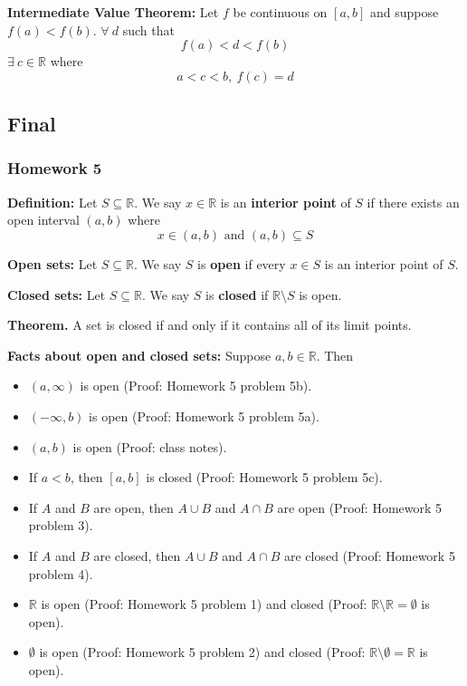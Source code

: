 \textbf{Intermediate Value Theorem:} Let \(f\) be continuous on \([a, b]\) and suppose \(f(a) < f(b)\). \(\forall \ d\) such that \[f(a) < d < f(b)\]  \(\exists \ c \in \mathbb{R}\) where \[a < c < b, \ f(c) = d\]

\pagebreak

\subsection{Final}

\subsubsection{Homework 5}

\textbf{Definition:} Let \(S \subseteq \mathbb{R}\). We say \(x \in \mathbb{R}\) is an \textbf{interior point} of \(S\) if there exists an open interval \((a, b)\) where \[x \in (a, b) \text{ and } (a, b) \subseteq S\]

\textbf{Open sets:} Let \(S \subseteq \mathbb{R}\). We say \(S\) is \textbf{open} if every \(x \in S\) is an interior point of \(S\).

\textbf{Closed sets:} Let \(S \subseteq \mathbb{R}\). We say \(S\) is \textbf{closed} if \(\mathbb{R} \setminus S\) is open.

\textbf{Theorem.} A set is closed if and only if it contains all of its limit points.

\textbf{Facts about open and closed sets:} Suppose \(a, b \in \mathbb{R}\). Then

\begin{itemize}

\item \((a, \infty)\) is open (Proof: Homework 5 problem 5b).

\item \((-\infty, b)\) is open (Proof: Homework 5 problem 5a).

\item \((a, b)\) is open (Proof: class notes).

\item If \(a < b\), then \([a, b]\) is closed (Proof: Homework 5 problem 5c).

\item If \(A\) and \(B\) are open, then \(A \cup B\) and \(A \cap B\) are open (Proof: Homework 5 problem 3).

\item If \(A\) and \(B\) are closed, then \(A \cup B\) and \(A \cap B\) are closed (Proof: Homework 5 problem 4).

\item \(\mathbb{R}\) is open (Proof: Homework 5 problem 1) and closed (Proof: \(\mathbb{R} \setminus \mathbb{R} = \emptyset\) is open).

\item \(\emptyset\) is open (Proof: Homework 5 problem 2) and closed (Proof: \(\mathbb{R} \setminus \emptyset = \mathbb{R}\) is open).

\end{itemize}

